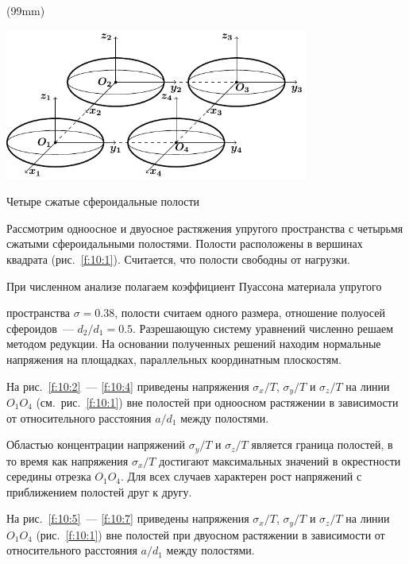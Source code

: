 \sidefig[t](99mm){
\includegraphics[width=10cm]{cartesian-oblate-spheroids-4.pdf}
\caption{Четыре сжатые сфероидальные полости}
\label{f:10:1}
}{Рассмотрим одноосное и двуосное растяжения упругого пространства с четырьмя сжатыми сфероидальными полостями. Полости расположены в вершинах квадрата (рис.~\ref{f:10:1}). Считается, что полости свободны от нагрузки.

При численном анализе полагаем коэффициент Пуассона материала упругого} пространства $\sigma=0.38$, полости считаем одного размера, отношение полуосей сфероидов~--- $d_2/d_1=0.5$. Разрешающую систему уравнений численно решаем методом редукции. На основании полученных решений находим нормальные напряжения на площадках, параллельных координатным плоскостям.

На рис.~\ref{f:10:2}~--- \ref{f:10:4} приведены напряжения $\sigma_x/T$, $\sigma_y/T$ и $\sigma_z/T$ на линии $O_1O_4$ (см.~рис.~\ref{f:10:1}) вне полостей при одноосном растяжении в зависимости от относительного расстояния $a/d_1$ между полостями.

Областью концентрации напряжений $\sigma_y/T$ и $\sigma_z/T$ является граница полостей, в то время как напряжения $\sigma_x/T$ достигают максимальных значений в окрестности середины отрезка $O_1O_4$. Для всех случаев характерен рост напряжений с приближением полостей друг к другу.

На рис.~\ref{f:10:5}~--- \ref{f:10:7} приведены напряжения $\sigma_x/T$, $\sigma_y/T$ и $\sigma_z/T$ на линии $O_1O_4$ (рис.~\ref{f:10:1}) вне полостей при двуосном растяжении в зависимости от относительного расстояния $a/d_1$ между полостями.

